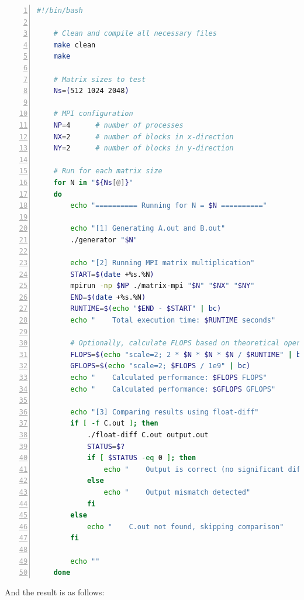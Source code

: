 \documentclass{article}
\begin{document}
\begin{lstlisting}[language=bash, basicstyle=\ttfamily\small, numbers=left, numberstyle=\tiny\color{gray}, stepnumber=1, frame=single, showstringspaces=false]
    #!/bin/bash

    # Clean and compile all necessary files
    make clean
    make
    
    # Matrix sizes to test
    Ns=(512 1024 2048)
    
    # MPI configuration
    NP=4      # number of processes
    NX=2      # number of blocks in x-direction
    NY=2      # number of blocks in y-direction
    
    # Run for each matrix size
    for N in "${Ns[@]}"
    do
        echo "========== Running for N = $N =========="
    
        echo "[1] Generating A.out and B.out"
        ./generator "$N"
    
        echo "[2] Running MPI matrix multiplication"
        START=$(date +%s.%N)
        mpirun -np $NP ./matrix-mpi "$N" "$NX" "$NY"
        END=$(date +%s.%N)
        RUNTIME=$(echo "$END - $START" | bc)
        echo "    Total execution time: $RUNTIME seconds"
    
        # Optionally, calculate FLOPS based on theoretical operations (2 * N^3)
        FLOPS=$(echo "scale=2; 2 * $N * $N * $N / $RUNTIME" | bc)
        GFLOPS=$(echo "scale=2; $FLOPS / 1e9" | bc)
        echo "    Calculated performance: $FLOPS FLOPS"
        echo "    Calculated performance: $GFLOPS GFLOPS"
    
        echo "[3] Comparing results using float-diff"
        if [ -f C.out ]; then
            ./float-diff C.out output.out
            STATUS=$?
            if [ $STATUS -eq 0 ]; then
                echo "    Output is correct (no significant difference)"
            else
                echo "    Output mismatch detected"
            fi
        else
            echo "    C.out not found, skipping comparison"
        fi
    
        echo ""
    done
\end{lstlisting}

And the result is as follows: 
\end{document}
